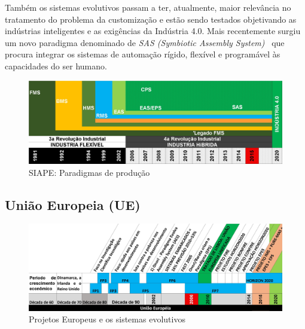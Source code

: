 Também os sistemas evolutivos passam a ter, atualmente, maior relevância no tratamento do problema da customização e estão sendo testados objetivando as indústrias inteligentes e as exigências da Indústria 4.0. Mais recentemente surgiu um novo paradigma denominado de \textit{SAS (Symbiotic Assembly System)}~\cite{FERREIRA2014} que procura integrar os sistemas de automação rígido, flexível e programável às capacidades do ser humano. %

\begin{figure}
	\centering
	\includegraphics[width=\textwidth]{img/F0_MeDSE_PARADIGMAS_0_V2.jpg} 
	\caption{SIAPE: Paradigmas de produção}
	\label{fig:paradigmas_producao}
\end{figure}
 
 

\subsection{União Europeia (UE)}


\begin{figure}[b]
	\centering
	\includegraphics[width=\textwidth]{img/F1_MeDSE_UE.jpg} 
	\caption{Projetos Europeus e os sistemas evolutivos}
	\label{fig:projetos_europeus}
\end{figure}


